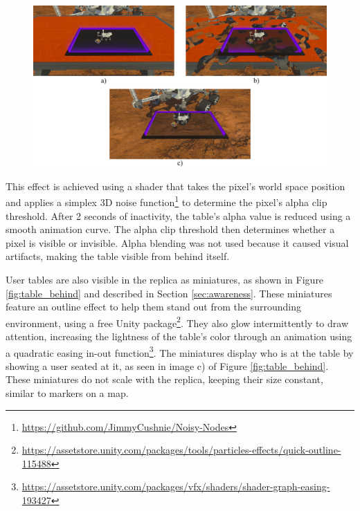         \begin{figure}[h!]
            \centering
            \includegraphics[width=1\textwidth]{figures/table_visibility.png}
            \label{fig:table_visibility}
        \end{figure}

        This effect is achieved using a shader that takes the pixel's world space position and applies a simplex 3D noise function\footnote{\url{https://github.com/JimmyCushnie/Noisy-Nodes}} to determine the pixel's alpha clip threshold. After 2 seconds of inactivity, the table's alpha value is reduced using a smooth animation curve. The alpha clip threshold then determines whether a pixel is visible or invisible. Alpha blending was not used because it caused visual artifacts, making the table visible from behind itself.

        User tables are also visible in the replica as miniatures, as shown in Figure \ref{fig:table_behind} and described in Section \ref{sec:awareness}. These miniatures feature an outline effect to help them stand out from the surrounding environment, using a free Unity package\footnote{\url{https://assetstore.unity.com/packages/tools/particles-effects/quick-outline-115488}}. They also glow intermittently to draw attention, increasing the lightness of the table's color through an animation using a quadratic easing in-out function\footnote{\url{https://assetstore.unity.com/packages/vfx/shaders/shader-graph-easing-193427}}. The miniatures display who is at the table by showing a user seated at it, as seen in image c) of Figure \ref{fig:table_behind}. These miniatures do not scale with the replica, keeping their size constant, similar to markers on a map.

